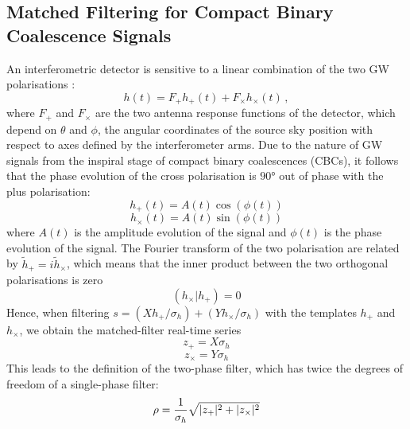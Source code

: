 \documentclass[binding=0.6cm, LaM]{sapthesis}
\begin{document}
\subsection{Matched Filtering for Compact Binary Coalescence Signals}
\label{subsec:mfcbc}
	An interferometric detector is sensitive to a linear combination 
	of the two GW polarisations \cite{26}: 
        \begin{equation}
          h(t) = F_{+}h_{+} (t) + F_{\times}h_{\times}(t)\,,
        \end{equation}
	where $F_{+}$ and $F_{\times}$ are the two antenna response functions of the detector, 
	which depend on $\theta$ and $\phi$, 
	the angular coordinates of the source sky position with respect to axes defined by the interferometer arms. 
	Due to the nature of GW signals from the inspiral stage of compact binary coalescences (CBCs), 
	it follows that the phase evolution of the cross polarisation is $\ang{90}$ out of phase with the plus polarisation:
        \begin{equation}
          h_{+}(t) = A(t) \cos (\phi (t))
        \end{equation}
        \begin{equation}
          h_{\times}(t) = A(t) \sin (\phi (t))  
        \end{equation}
	where $A(t)$ is the amplitude evolution of the signal 
	and $\phi(t)$ is the phase evolution of the signal. 
	The Fourier transform of the two polarisation are related by $\tilde h_{+} = i\tilde{h}_{\times}$, 
	which means that the inner product between the two orthogonal polarisations is zero 
        \begin{equation}
          (h_{\times}|h_{+}) = 0
        \end{equation}
	Hence, when filtering  $s = (Xh_{+}/\sigma_{h}) + (Y h_{\times}/\sigma_{h})$ 
	with the templates $h_{+}$ and $h_{\times}$, we obtain the matched-filter real-time series
        \begin{equation}
          z_{+} = X\sigma_{h}
        \end{equation}
        \begin{equation}
          z_{\times} = Y \sigma_{h} 
        \end{equation}
	This leads to the definition of the two-phase filter, 
	which has twice the degrees of freedom of a single-phase filter:
        \begin{equation}
          \rho = {1 \over \sigma_h} \sqrt{|z_{+}| ^2+ |z_{\times}|^2}
        \end{equation}
\end{document}

